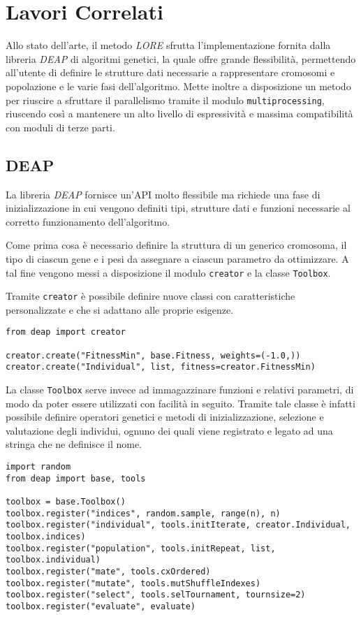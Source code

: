 \chapter{Lavori Correlati}\label{cap: related_works}

Allo stato dell'arte, il metodo \textit{LORE} sfrutta l'implementazione fornita
dalla libreria \textit{DEAP} di algoritmi genetici, la quale offre grande
flessibilità, permettendo all'utente di definire le strutture dati necessarie
a rappresentare cromosomi e popolazione e le varie fasi dell'algoritmo.
Mette inoltre a disposizione un metodo per riuscire a sfruttare il parallelismo
tramite il modulo \verb|multiprocessing|, riuscendo così a mantenere un alto
livello di espressività e massima compatibilità con moduli di terze parti.

\section*{DEAP}

La libreria \textit{DEAP} fornisce un'API molto flessibile ma richiede una fase
di inizializzazione in cui vengono definiti tipi, strutture dati e funzioni
necessarie al corretto funzionamento dell'algoritmo.

Come prima cosa è necessario definire la struttura di un generico cromosoma, il
tipo di ciascun gene e i pesi da assegnare a ciascun parametro da ottimizzare.
A tal fine vengono messi a disposizione il modulo \verb|creator| e la classe
\verb|Toolbox|.

Tramite \verb|creator| è possibile definire nuove classi con caratteristiche
personalizzate e che si adattano alle proprie esigenze.

\begin{lstlisting}[caption={Definizione fitness e strutture dati con DEAP}]
from deap import creator

creator.create("FitnessMin", base.Fitness, weights=(-1.0,))
creator.create("Individual", list, fitness=creator.FitnessMin)
\end{lstlisting}

La classe \verb|Toolbox| serve invece ad immagazzinare funzioni e relativi
parametri, di modo da poter essere utilizzati con facilità in seguito. Tramite
tale classe è infatti possibile definire operatori genetici e metodi di
inizializzazione, selezione e valutazione degli individui, ognuno dei quali
viene registrato e legato ad una stringa che ne definisce il nome.

\begin{lstlisting}[caption={Registrazione metodi e operatori con DEAP}]
import random
from deap import base, tools

toolbox = base.Toolbox()
toolbox.register("indices", random.sample, range(n), n)
toolbox.register("individual", tools.initIterate, creator.Individual, toolbox.indices)
toolbox.register("population", tools.initRepeat, list, toolbox.individual)
toolbox.register("mate", tools.cxOrdered)
toolbox.register("mutate", tools.mutShuffleIndexes)
toolbox.register("select", tools.selTournament, tournsize=2)
toolbox.register("evaluate", evaluate)
\end{lstlisting}

